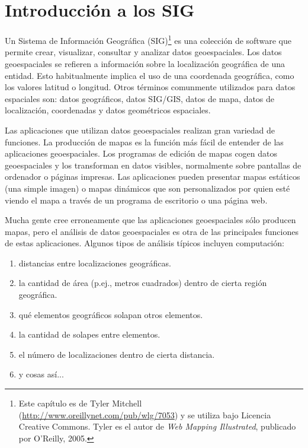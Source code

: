 
\section{Introducción a los SIG}\label{label_intro}

Un Sistema de Información Geográfica (SIG)\cite{mitchel05}\footnote{Este 
capítulo es de Tyler Mitchell (\url{http://www.oreillynet.com/pub/wlg/7053}) y 
se utiliza bajo Licencia Creative Commons. Tyler es el autor de 
\textit{Web Mapping Illustrated}, publicado por O'Reilly, 2005.}
es una colección de software que permite crear, visualizar, consultar y 
analizar datos geoespaciales. Los datos geoespaciales se refieren a 
información sobre la localización geográfica de una entidad. Esto 
habitualmente implica el uso de una coordenada geográfica, como los valores 
latitud o longitud. Otros términos comunmente utilizados para datos espaciales 
son: datos geográficos, datos SIG/GIS, datos de mapa, datos de localización, 
coordenadas y datos geométricos espaciales.

Las aplicaciones que utilizan datos geoespaciales realizan gran variedad de 
funciones. La producción de mapas es la función más fácil de entender de 
las aplicaciones geoespaciales. Los programas de edición de mapas cogen datos 
geoespaciales y los transforman en datos visibles, normalmente sobre pantallas
de ordenador o páginas impresas.
Las aplicaciones pueden presentar mapas estáticos (una simple imagen) o mapas
dinámicos que son personalizados por quien esté viendo el mapa a través de 
un programa de escritorio o una página web.

Mucha gente cree erroneamente que las aplicaciones geoespaciales sólo producen
mapas, pero el análisis de datos geoespaciales es otra de las principales 
funciones de estas aplicaciones. Algunos tipos de análisis típicos incluyen
computación:

\begin{enumerate}
\item distancias entre localizaciones geográficas.
\item la cantidad de área (p.ej., metros cuadrados) dentro de cierta región
geográfica.
\item qué elementos geográficos solapan otros elementos.
\item la cantidad de solapes entre elementos.
\item el número de localizaciones dentro de cierta distancia.
\item y cosas así...
\end{enumerate}

